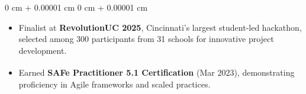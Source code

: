 \documentclass[9pt, letterpaper]{article}
\newenvironment{highlights}{
    \begin{itemize}[
        topsep=0.05 cm,
        parsep=0 pt,
        partopsep=0pt,
        itemsep=0pt,
        leftmargin=10pt
    ]
}{
    \end{itemize}
} %
\newenvironment{onecolentry}{
    \begin{adjustwidth}{
        0 cm + 0.00001 cm}{
        0 cm + 0.00001 cm}
}{
    \end{adjustwidth}
} %
\begin{document}
    \begin{onecolentry}
        \begin{highlights}
            \item Finalist at \textbf{RevolutionUC 2025}, Cincinnati’s largest student-led hackathon, selected among 300 participants from 31 schools for innovative project development.
            \item Earned \textbf{SAFe\textsuperscript{\textregistered} Practitioner 5.1 Certification} (Mar 2023), demonstrating proficiency in Agile frameworks and scaled practices.
        \end{highlights}
    \end{onecolentry}





% 


% 
\end{document}
